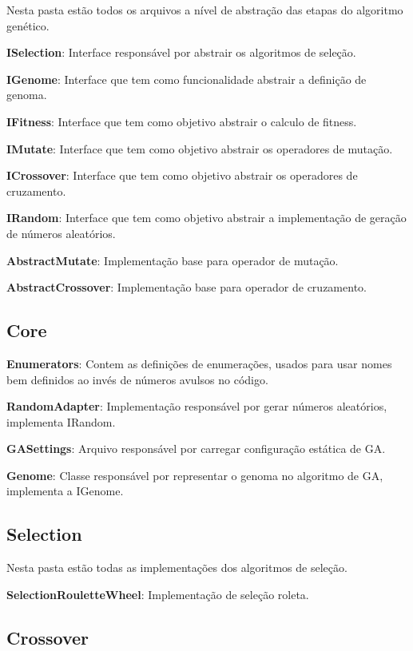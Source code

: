 Nesta pasta estão todos os arquivos a nível de abstração das etapas do algoritmo genético.

\textbf{ISelection}: Interface responsável por abstrair os algoritmos de seleção.

\textbf{IGenome}: Interface que tem como funcionalidade abstrair a definição de genoma.

\textbf{IFitness}: Interface que tem como objetivo abstrair o calculo de fitness.

\textbf{IMutate}: Interface que tem como objetivo abstrair os operadores de mutação.

\textbf{ICrossover}:  Interface que tem como objetivo abstrair os operadores de cruzamento.

\textbf{IRandom}: Interface que tem como objetivo abstrair a implementação de geração de números aleatórios.

\textbf{AbstractMutate}: Implementação base para operador de mutação.

\textbf{AbstractCrossover}: Implementação base para operador de cruzamento.

\subsection{Core}

\textbf{Enumerators}: Contem as definições de enumerações, usados para usar nomes bem definidos ao invés de números avulsos no código.

\textbf{RandomAdapter}: Implementação responsável por gerar números aleatórios, implementa IRandom.

\textbf{GASettings}: Arquivo responsável por carregar configuração estática de GA.

\textbf{Genome}: Classe responsável por representar o genoma no algoritmo de GA, implementa a IGenome.

\subsection{Selection}

Nesta pasta estão todas as implementações dos algoritmos de seleção.

\textbf{SelectionRouletteWheel}: Implementação de seleção roleta.

\subsection{Crossover}

